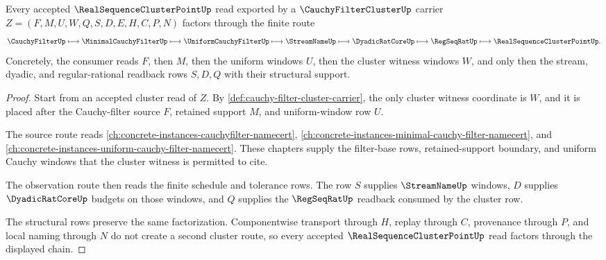 \begin{theorem}\label{thm:cauchy-filter-cluster-cluster-route}
Every accepted $\RealSequenceClusterPointUp$ read exported by a $\CauchyFilterClusterUp$ carrier $Z=(F,M,U,W,Q,S,D,E,H,C,P,N)$ factors through the finite route
$$
\CauchyFilterUp \longmapsto \MinimalCauchyFilterUp \longmapsto \UniformCauchyFilterUp \longmapsto \StreamNameUp \longmapsto \DyadicRatCoreUp \longmapsto \RegSeqRatUp \longmapsto \RealSequenceClusterPointUp .
$$
Concretely, the consumer reads $F$, then $M$, then the uniform windows $U$, then the cluster witness windows $W$, and only then the stream, dyadic, and regular-rational readback rows $S,D,Q$ with their structural support.
\end{theorem}
\begin{proof}
Start from an accepted cluster read of $Z$. By \autoref{def:cauchy-filter-cluster-carrier}, the only cluster witness coordinate is $W$, and it is placed after the Cauchy-filter source $F$, retained support $M$, and uniform-window row $U$.

The source route reads \autoref{ch:concrete-instances-cauchyfilter-namecert}, \autoref{ch:concrete-instances-minimal-cauchy-filter-namecert}, and \autoref{ch:concrete-instances-uniform-cauchy-filter-namecert}. These chapters supply the filter-base rows, retained-support boundary, and uniform Cauchy windows that the cluster witness is permitted to cite.

The observation route then reads the finite schedule and tolerance rows. The row $S$ supplies $\StreamNameUp$ windows, $D$ supplies $\DyadicRatCoreUp$ budgets on those windows, and $Q$ supplies the $\RegSeqRatUp$ readback consumed by the cluster row.

The structural rows preserve the same factorization. Componentwise transport through $H$, replay through $C$, provenance through $P$, and local naming through $N$ do not create a second cluster route, so every accepted $\RealSequenceClusterPointUp$ read factors through the displayed chain.
\end{proof}

